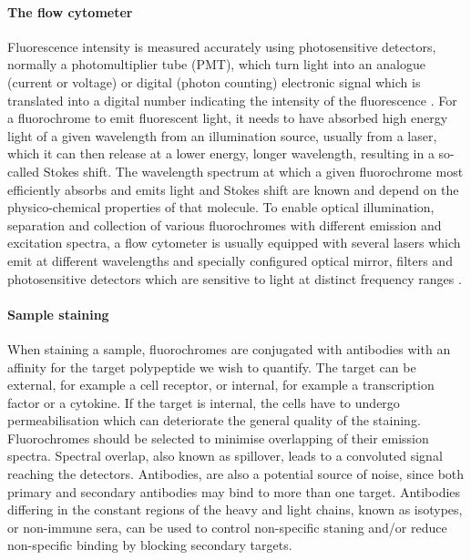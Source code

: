 \paragraph{The flow cytometer}
Fluorescence intensity is measured accurately using photosensitive detectors, normally a photomultiplier tube (PMT), which turn light into an analogue (current or voltage)
or digital (photon counting) electronic signal which is translated into a digital number indicating the intensity of the fluorescence \citep{Shapiro:2003vq,Snow:2004ci}.
For a fluorochrome to emit fluorescent light, it needs to have absorbed high energy light of a given wavelength from an illumination source, usually from a laser, which it can then release at a lower energy, longer wavelength, resulting in a so-called Stokes shift.
The wavelength spectrum at which a given fluorochrome most efficiently absorbs and emits light and Stokes shift are known and depend on the physico-chemical properties of that molecule.
To enable optical illumination, separation and collection of various fluorochromes with different emission and excitation spectra, a flow cytometer is usually equipped with several lasers which emit at different wavelengths and specially configured optical mirror, filters and photosensitive detectors which are sensitive to light at distinct frequency ranges \citep{Shapiro:2003vq}.

\paragraph{Sample staining} 
When staining a sample, fluorochromes are conjugated with antibodies with an affinity for the target polypeptide we wish to quantify.
The target can be external, for example a cell receptor, or internal, for example a transcription factor or a cytokine.
If the target is internal, the cells have to undergo permeabilisation which can deteriorate the general quality of the staining.
Fluorochromes should be selected to minimise overlapping of their emission spectra.
Spectral overlap, also known as spillover, leads to a convoluted signal reaching the detectors.
Antibodies, are also a potential source of noise, since both primary and secondary antibodies may bind to more than one target.
Antibodies differing in the constant regions of the heavy and light chains, known as isotypes, or non-immune sera, can be used to control non-specific staning and/or reduce non-specific binding by blocking secondary targets.

